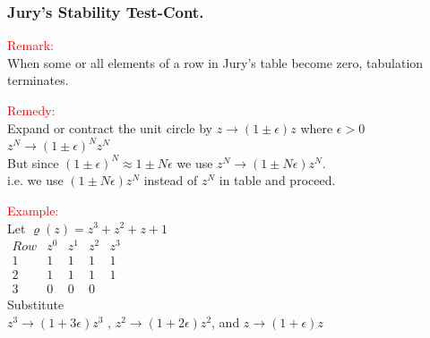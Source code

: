 \documentclass[mathserif, 10pt]{beamer} %
\begin{document}
\frame
{
\normalsize

\frametitle{Jury's Stability Test-Cont. }

\textcolor{red}{Remark:}\\
When some or all elements of a row in Jury's table become zero, tabulation terminates. \\ \vspace{.05in}

\textcolor{red}{Remedy:}\\
Expand or contract the unit circle by $z \to (1\pm \epsilon)z$ where $\epsilon>0$\\
$z^N \to (1\pm \epsilon)^Nz^N$\\
But since $(1\pm \epsilon)^N \approx 1\pm N\epsilon$  we use $z^N \to (1\pm N \epsilon)z^N$. \\
i.e. we use $(1\pm N\epsilon)z^N$ instead of $z^N$ in table and proceed. \\ \vspace{.05in}

\textcolor{red}{Example:}\\ \vspace{.05in}
Let $\varrho(z) = z^3+z^2+z+1$\\

$\begin{array}{ccccc}
	Row&z^0&z^1&z^2&z^3\\
	1&1&1&1&1\\
	2&1&1&1&1\\
	3&0&0&0
\end{array}$\\
Substitute \\
$z^3 \to (1+3\epsilon)z^3$ , \hspace{0.1in}
$z^2 \to (1+2\epsilon)z^2$, \hspace{0.1in} and
$z \to (1+\epsilon)z$

}
\end{document}
